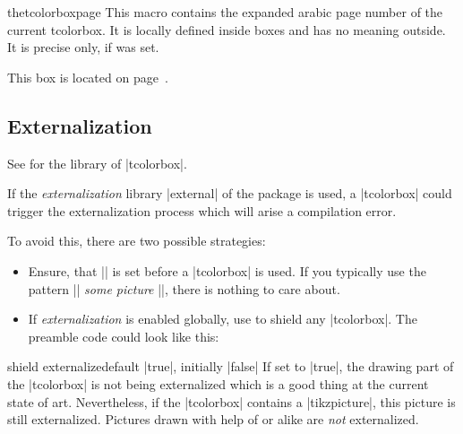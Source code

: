 \begin{docCommand}[doc new=2015-11-13]{thetcolorboxpage}{}
This macro contains the expanded arabic page number of the current tcolorbox.
It is locally defined inside boxes and has no meaning outside.
It is precise only, if  was set.

\begin{dispExample}
\begin{tcolorbox}[colback=yellow!5,check odd page,
    title=Box on page~\thetcolorboxpage]
  This box is located on page~\thetcolorboxpage.
\end{tcolorbox}
\end{dispExample}
\end{docCommand}





\clearpage
\subsection{Externalization}
\begin{marker}
See  for the  library of |tcolorbox|.
\end{marker}

If the \emph{externalization} library |external| of the  package is used,
a |tcolorbox| could trigger the externalization process which will arise
a compilation error.

To avoid this, there are two possible strategies:
\begin{itemize}
\item Ensure, that |\tikzexternaldisable| is set before a |tcolorbox| is used.
  If you typically use the pattern |\tikzexternalenable| \textit{some picture} |\tikzexternaldisable|,
  there is nothing to care about.
\item If \emph{externalization} is enabled globally, use  to
  shield any |tcolorbox|. The preamble code could look like this:
\begin{dispListing}
\usetikzlibrary{external}
\tikzexternalize
{}
\end{dispListing}
\end{itemize}

\begin{docTcbKey}{shield externalize}{}{default |true|, initially |false|}
If set to |true|, the drawing part of the |tcolorbox| is not being externalized
which is a good thing at the current state of art. Nevertheless, if the
|tcolorbox| contains a |tikzpicture|, this picture is still externalized.
Pictures drawn with help of  or alike are \emph{not}
externalized.
\end{docTcbKey}

